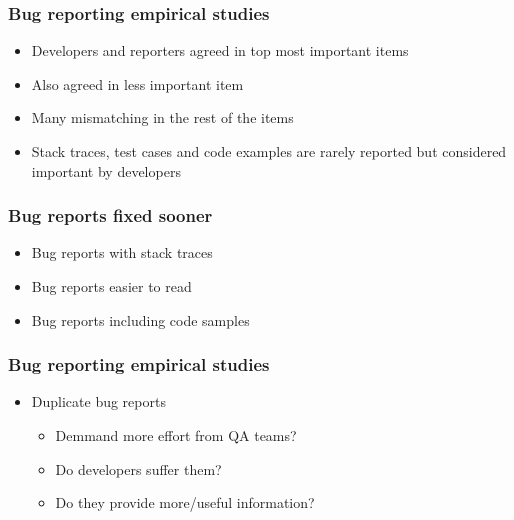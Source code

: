 \documentclass{beamer}
\begin{document}
\begin{frame}
 \frametitle{Bug reporting empirical studies}
 \begin{itemize}
    \item Developers and reporters agreed in top most important items
    \item Also agreed in less important item
    \item Many mismatching in the rest of the items
    \item Stack traces, test cases and code examples are rarely reported but considered important by developers
 \end{itemize}
\end{frame}


\begin{frame}
 \frametitle{Bug reports fixed sooner}
 \begin{itemize}
    \item Bug reports with stack traces
    \item Bug reports easier to read
    \item Bug reports including code samples
 \end{itemize}
\end{frame}


\begin{frame}
 \frametitle{Bug reporting empirical studies}
 \begin{itemize}
    \item Duplicate bug reports
       \begin{itemize}
       \item Demmand more effort from QA teams?
       \item Do developers suffer them?
       \item Do they provide more/useful information?
       \end{itemize}
 \end{itemize}
\end{frame}
\end{document}
